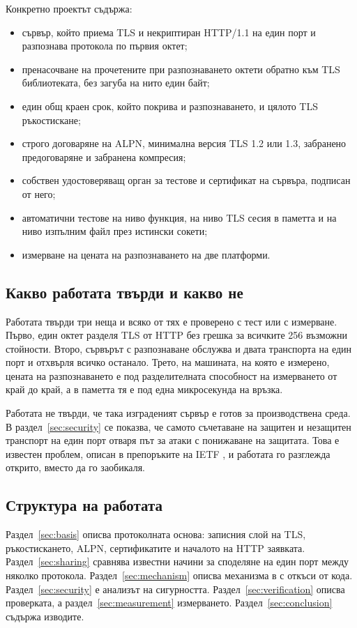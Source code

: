 Конкретно проектът съдържа:
\begin{itemize}
\item сървър, който приема TLS и некриптиран HTTP/1.1 на един порт и разпознава протокола
  по първия октет;
\item пренасочване на прочетените при разпознаването октети обратно към TLS библиотеката,
  без загуба на нито един байт;
\item един общ краен срок, който покрива и разпознаването, и цялото TLS ръкостискане;
\item строго договаряне на ALPN, минимална версия TLS 1.2 или 1.3, забранено
  предоговаряне и забранена компресия;
\item собствен удостоверяващ орган за тестове и сертификат на сървъра, подписан от него;
\item автоматични тестове на ниво функция, на ниво TLS сесия в паметта и на ниво
  изпълним файл през истински сокети;
\item измерване на цената на разпознаването на две платформи.
\end{itemize}

\subsection{Какво работата твърди и какво не}

Работата твърди три неща и всяко от тях е проверено с тест или с измерване. Първо, един
октет разделя TLS от HTTP без грешка за всичките 256 възможни стойности. Второ, сървърът
с разпознаване обслужва и двата транспорта на един порт и отхвърля всичко останало.
Трето, на машината, на която е измерено, цената на разпознаването е под разделителната
способност на измерването от край до край, а в паметта тя е под една микросекунда на
връзка.

Работата не твърди, че така изграденият сървър е готов за производствена среда. В
раздел~\ref{sec:security} се показва, че самото съчетаване на защитен и незащитен
транспорт на един порт отваря път за атаки с понижаване на защитата. Това е известен
проблем, описан в препоръките на IETF \cite{rfc9325}, и работата го разглежда открито,
вместо да го заобикаля.

\subsection{Структура на работата}

Раздел~\ref{sec:basis} описва протоколната основа: записния слой на TLS, ръкостискането,
ALPN, сертификатите и началото на HTTP заявката. Раздел~\ref{sec:sharing} сравнява
известни начини за споделяне на един порт между няколко протокола. Раздел~\ref{sec:mechanism}
описва механизма в  с откъси от кода. Раздел~\ref{sec:security} е анализът на
сигурността. Раздел~\ref{sec:verification} описва проверката, а раздел~\ref{sec:measurement}
измерването. Раздел~\ref{sec:conclusion} съдържа изводите.
